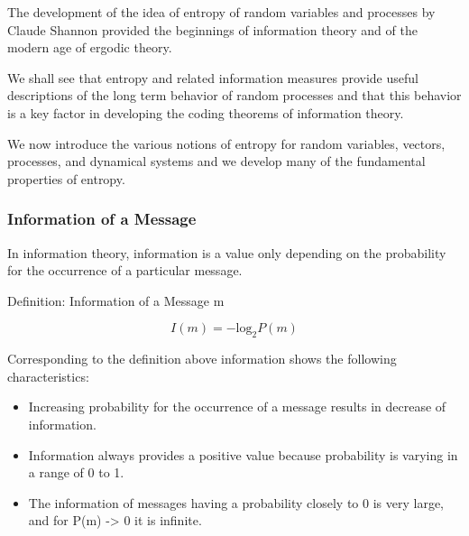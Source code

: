 \begin{frame}
The development of the idea of entropy of random variables and processes by
Claude Shannon provided the beginnings of information theory and of the modern
age of ergodic theory. 


We shall see that entropy and related information
measures provide useful descriptions of the long term behavior of random processes
and that this behavior is a key factor in developing the coding theorems
of information theory. 


We now introduce the various notions of entropy for random
variables, vectors, processes, and dynamical systems and we develop many
of the fundamental properties of entropy.
\end{frame}

\begin{frame}
\frametitle{Information of a Message}


In information theory, information is a value only depending on the probability for the occurrence of a particular message.



Definition: Information of a Message m


\[   I(m) = - \mbox{log}_2 P(m)\]



Corresponding to the definition above information shows the following characteristics:
\begin{itemize}
\item Increasing probability for the occurrence of a message results in decrease of information. 
\item Information always provides a positive value because probability is varying in a range of 0 to 1. 
\item The information of messages having a probability closely to 0 is very large, and for P(m) -> 0 it is infinite. 
\end{itemize}
\end{frame}




